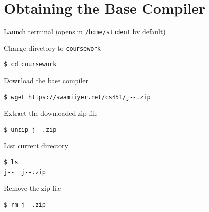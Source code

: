 \documentclass[8pt,a4paper,compress]{beamer}
\begin{document}
\section{Obtaining the Base \protect \jmm Compiler}
\begin{frame}[fragile]
\pause\transdissolve

Launch terminal (opens in \lstinline{/home/student} by default)

\pause\transdissolve\bigskip

Change directory to \lstinline{coursework}

\begin{tcolorbox}[enhanced,drop shadow southwest,sharp corners,size=fbox,colback=black]
\begin{lstlisting}[style=terminal]
$ cd coursework
\end{lstlisting}
\end{tcolorbox}

\pause\transdissolve\bigskip

Download the base \jmm compiler

\begin{tcolorbox}[enhanced,drop shadow southwest,sharp corners,size=fbox,colback=black]
\begin{lstlisting}[style=terminal]
$ wget https://swamiiyer.net/cs451/j--.zip
\end{lstlisting}
\end{tcolorbox}

\pause\transdissolve\bigskip

Extract the downloaded zip file

\begin{tcolorbox}[enhanced,drop shadow southwest,sharp corners,size=fbox,colback=black]
\begin{lstlisting}[style=terminal]
$ unzip j--.zip
\end{lstlisting}
\end{tcolorbox}

\pause\transdissolve\bigskip

List current directory

\begin{tcolorbox}[enhanced,drop shadow southwest,sharp corners,size=fbox,colback=black]
\begin{lstlisting}[style=terminal]
$ ls
j--  j--.zip
\end{lstlisting}
\end{tcolorbox}

\pause\transdissolve\bigskip

Remove the zip file

\begin{tcolorbox}[enhanced,drop shadow southwest,sharp corners,size=fbox,colback=black]
\begin{lstlisting}[style=terminal]
$ rm j--.zip
\end{lstlisting}
\end{tcolorbox}
\end{frame}
\end{document}
